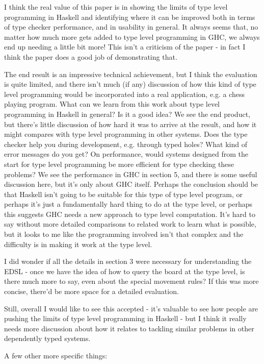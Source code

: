 I think the real value of this paper is in showing the limits of type level programming in Haskell and identifying where it can be improved both in terms of type checker performance, and in usability in general. It always seems that, no matter how much more gets added to type level programming in GHC, we always end up needing a little bit more! This isn't a criticism of the paper - in fact I think the paper does a good job of demonstrating that.

The end result is an impressive technical achievement, but I think the evaluation is quite limited, and there isn't much (if any) discussion of how this kind of type level programming would be incorporated into a real application, e.g. a chess playing program. What can we learn from this work about type level programming in Haskell in general? Is it a good idea? We see the end product, but there's little discussion of how hard it was to arrive at the result, and how it might compares with type level programming in other systems. Does the type checker help you during development, e.g. through typed holes? What kind of error messages do you get? On performance, would systems designed from the start for type level programming be more efficient for type checking these problems? We see the performance in GHC in section 5, and there is some useful discussion here, but it's only about GHC itself. Perhaps the conclusion should be that Haskell isn't going to be suitable for this type of type level program, or perhaps it's just a fundamentally hard thing to do at the type level, or perhaps this suggests GHC needs a new approach to type level computation. It's hard to say without more detailed comparisons to related work to learn what is possible, but it looks to me like the programming involved isn't that complex and the difficulty is in making it work at the type level.

I did wonder if all the details in section 3 were necessary for understanding the EDSL - once we have the idea of how to query the board at the type level, is there much more to say, even about the special movement rules? If this was more concise, there'd be more space for a detailed evaluation.

Still, overall I would like to see this accepted - it's valuable to see how people are pushing the limits of type level programming in Haskell - but I think it really needs more discussion about how it relates to tackling similar problems in other dependently typed systems.

A few other more specific things:

